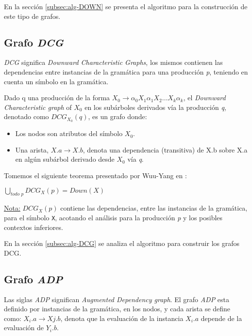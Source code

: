 En la sección \ref{subsec:alg-DOWN} se presenta el algoritmo para la construcción de este tipo de grafos.

\subsection{Grafo \textit{DCG}}

\textit{DCG} significa \textit{Downward Characteristic Graphs}, los mismos contienen las dependencias entre instancias de la gramática para una producción \textit{p}, teniendo en cuenta un símbolo en la gramática.
\begin{definition}
Dado q una producción de la forma $X_{0}\rightarrow \alpha_{0} X_{1} \alpha_{1} X_{2} \dots X_{k} \alpha_{k}$, el \textit{Downward Characteristic graph} of $X_{0}$ en los subárboles derivados vía la producción \textit{q}, denotado como $DCG_{X_{0}}(q)$, es un grafo donde: 
\begin{itemize}
\item Los nodos son atributos del símbolo $X_{0}$.
\item Una arista, $X.a \rightarrow X.b$, denota una dependencia (transitiva) de X.b sobre X.a en algún subárbol derivado desde $X_{0}$ vía \textit{q}.
\end{itemize}
\end{definition}
Tomemos el siguiente teorema presentado por Wuu-Yang en \cite{wuu-yang1}:
\begin{theorem}
$\bigcup\limits_{\textit{todo p}}{DCG_{X} (p) = Down (X)}$
\end{theorem}
\underline{Nota:} $DCG_{X}(p)$ contiene las dependencias, entre las instancias de la gramática, para el símbolo \texttt{X}, acotando el análisis para la producción \textit{p} y los posibles contextos inferiores.

En la sección \ref{subsec:alg-DCG} se analiza el algoritmo para construir los grafos DCG.

\subsection{Grafo \textit{ADP}}
\label{mag:adpdef}

Las siglas \textit{ADP} significan \textit{Augmented Dependency graph}. El grafo \textit{ADP} esta definido por instancias de la gramática, en los nodos, y cada arista se define como: $X_{i}.a\rightarrow X{j}.b$, denota que la evaluación de la instancia \textit{$X_{i}.a$} depende de la evaluación de \textit{$Y_{i}.b$}.

